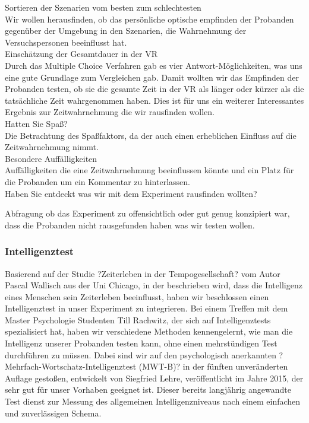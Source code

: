 \documentclass{Bericht}
\begin{document}
Sortieren der Szenarien vom besten zum schlechtesten \\

Wir wollen herausfinden, ob das persönliche optische empfinden der Probanden gegenüber der Umgebung in den Szenarien, die Wahrnehmung der Versuchspersonen beeinflusst hat. \\

Einschätzung der Gesamtdauer in der VR\\

Durch das Multiple Choice Verfahren gab es vier Antwort-Möglichkeiten, was uns eine gute Grundlage zum Vergleichen gab. Damit wollten wir das Empfinden der Probanden testen, ob sie die gesamte Zeit in der VR als länger oder kürzer als die tatsächliche Zeit wahrgenommen haben. Dies ist für uns ein weiterer Interessantes Ergebnis zur Zeitwahrnehmung die wir rausfinden wollen. \\

Hatten Sie Spaß? \\

Die Betrachtung des Spaßfaktors,  da der auch einen erheblichen Einfluss auf die Zeitwahrnehmung nimmt. \\

Besondere Auffälligkeiten \\

Auffälligkeiten die eine Zeitwahrnehmung beeinflussen könnte und ein Platz für die Probanden um ein Kommentar zu hinterlassen. \\

Haben Sie entdeckt was wir mit dem Experiment rausfinden wollten?

Abfragung ob das Experiment zu offensichtlich oder gut genug konzipiert war, dass die Probanden nicht rausgefunden haben was wir testen wollen. 

\par

\subsubsection{Intelligenztest}

Basierend auf der Studie ?Zeiterleben in der Tempogesellschaft? vom Autor Pascal Wallisch aus der Uni Chicago, in der beschrieben wird, dass die Intelligenz eines Menschen sein Zeiterleben beeinflusst, haben wir beschlossen einen Intelligenztest in unser Experiment zu integrieren. Bei einem Treffen mit dem Master Psychologie Studenten Till Rachwitz, der sich auf Intelligenztests spezialisiert hat, haben wir verschiedene Methoden kennengelernt, wie man die Intelligenz unserer Probanden testen kann, ohne einen mehrstündigen Test durchführen zu müssen. Dabei sind wir auf den psychologisch anerkannten ?Mehrfach-Wortschatz-Intelligenztest (MWT-B)? in der fünften unveränderten Auflage gestoßen, entwickelt von Siegfried Lehre, veröffentlicht im Jahre 2015, der sehr gut für unser Vorhaben geeignet ist. Dieser bereits langjährig angewandte Test dienst zur Messung des allgemeinen Intelligenzniveaus nach einem einfachen und zuverlässigen Schema. \\
\end{document}
